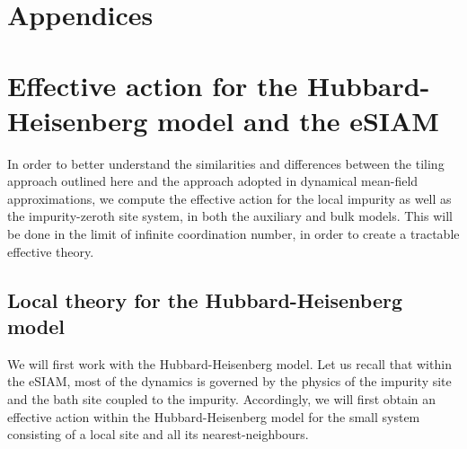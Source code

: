 \documentclass[reprint,hidelinks]{revtex4-2}
\begin{document}
\begin{widetext}
\clearpage
\section*{Appendices}
\appendix
\section{Effective action for the Hubbard-Heisenberg model and the eSIAM}
In order to better understand the similarities and differences between the tiling approach outlined here and the approach adopted in dynamical mean-field approximations, we compute the effective action for the local impurity as well as the impurity-zeroth site system, in both the auxiliary and bulk models. This will be done in the limit of infinite coordination number, in order to create a tractable effective theory.

\subsection{Local theory for the Hubbard-Heisenberg model}
We will first work with the Hubbard-Heisenberg model. Let us recall that within the eSIAM, most of the dynamics is governed by the physics of the impurity site and the bath site coupled to the impurity. Accordingly, we will first obtain an effective action within the Hubbard-Heisenberg model for the small system consisting of a local site and all its nearest-neighbours. 


\end{widetext}
\end{document}
